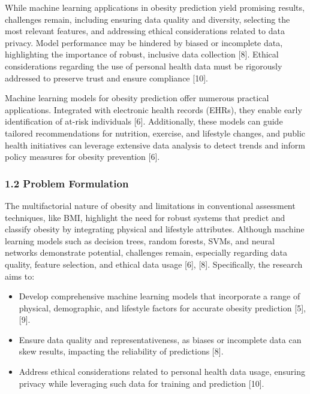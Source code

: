 While machine learning applications in obesity prediction yield
promising results, challenges remain, including ensuring data quality
and diversity, selecting the most relevant features, and addressing
ethical considerations related to data privacy. Model performance may be
hindered by biased or incomplete data, highlighting the importance of
robust, inclusive data collection {[}8{]}. Ethical considerations
regarding the use of personal health data must be rigorously addressed
to preserve trust and ensure compliance {[}10{]}.

Machine learning models for obesity prediction offer numerous practical
applications. Integrated with electronic health records (EHRs), they
enable early identification of at-risk individuals {[}6{]}.
Additionally, these models can guide tailored recommendations for
nutrition, exercise, and lifestyle changes, and public health
initiatives can leverage extensive data analysis to detect trends and
inform policy measures for obesity prevention {[}6{]}.

\hypertarget{problem-formulation}{%
\subsubsection{1.2 Problem Formulation}\label{problem-formulation}}

The multifactorial nature of obesity and limitations in conventional
assessment techniques, like BMI, highlight the need for robust systems
that predict and classify obesity by integrating physical and lifestyle
attributes. Although machine learning models such as decision trees,
random forests, SVMs, and neural networks demonstrate potential,
challenges remain, especially regarding data quality, feature selection,
and ethical data usage {[}6{]}, {[}8{]}. Specifically, the research aims
to:

\begin{itemize}
\tightlist
\item
  Develop comprehensive machine learning models that incorporate a range
  of physical, demographic, and lifestyle factors for accurate obesity
  prediction {[}5{]}, {[}9{]}.
\item
  Ensure data quality and representativeness, as biases or incomplete
  data can skew results, impacting the reliability of predictions
  {[}8{]}.
\item
  Address ethical considerations related to personal health data usage,
  ensuring privacy while leveraging such data for training and
  prediction {[}10{]}.
\end{itemize}


